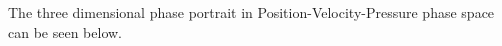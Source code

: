 % 

The three dimensional phase portrait in Position-Velocity-Pressure phase space can be seen below.

